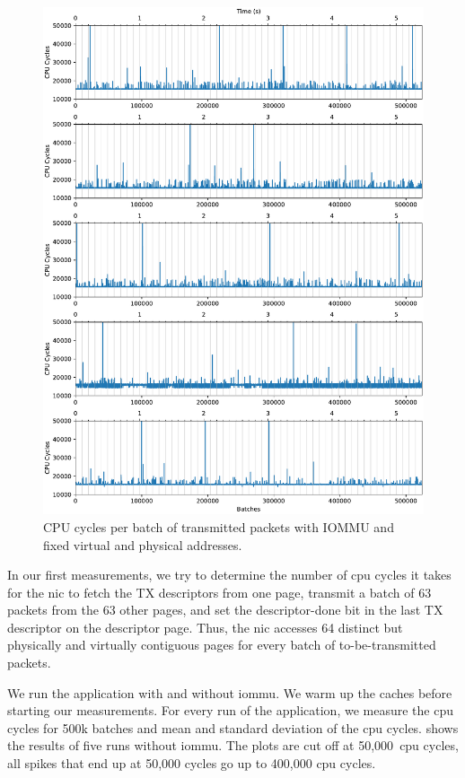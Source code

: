 \begin{figure}%
    \centering
    \includegraphics[width=1.0\textwidth]{figures/iotlb-baseline-iommu-pt-fixed}
    \caption{CPU cycles per batch of transmitted packets with IOMMU and fixed
virtual and physical addresses.}
    \label{fig:cycles-iommu-pt-fixed}
\end{figure}

In our first measurements, we try to determine the number of \ac{cpu} cycles it
takes for the \ac{nic} to fetch the TX descriptors from one page, transmit a
batch of 63 packets from the 63 other pages, and set the descriptor-done bit in
the last TX descriptor on the descriptor page. Thus, the \ac{nic} accesses 64
distinct but physically and virtually contiguous pages for every batch of
to-be-transmitted packets.

We run the application with and without \ac{iommu}. We warm up the caches before
starting our measurements. For every run of the application, we measure the
\ac{cpu} cycles for 500k batches and mean and standard deviation of the
\ac{cpu} cycles.  shows the results of five runs
without \ac{iommu}. The plots are cut off at 50,000~\ac{cpu} cycles, all spikes
that end up at 50,000 cycles go up to 400,000 \ac{cpu} cycles.

